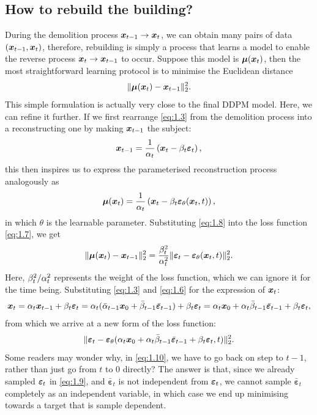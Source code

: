 \subsection{How to rebuild the building?}

During the demolition process $\bm{x}_{t-1}\to\bm{x}_{t}$, we can obtain many pairs of data $(\bm{x}_{t-1},\bm{x}_{t})$, therefore, rebuilding is simply a process that learns a model to enable the reverse process $\bm{x}_{t}\to\bm{x}_{t-1}$ to occur. Suppose this model is $\bm{\mu}(\bm{x}_{t})$, then the most straightforward learning protocol is to minimise the Euclidean distance
\begin{equation}
    \label{eq:1.7}
    \|\bm{\mu}(\bm{x}_{t})-\bm{x}_{t-1}\|_2^2.
\end{equation}
This simple formulation is actually very close to the final DDPM model. Here, we can refine it further. If we first rearrange \cref{eq:1.3} from the demolition process into a reconstructing one by making $\bm{x}_{t-1}$ the subject:
\begin{equation*}
    \bm{x}_{t-1}=\frac{1}{\alpha_t}\left(\bm{x}_{t}-\beta_t\bm{\varepsilon}_t\right),
\end{equation*}
this then inspires us to express the parameterised reconstruction process analogously as
\begin{equation}
    \label{eq:1.8}
    \bm{\mu}(\bm{x}_{t})=\frac{1}{\alpha_t}\left(\bm{x}_{t}-\beta_t\bm{\varepsilon}_\theta(\bm{x}_{t},t)\right),
\end{equation}
in which $\theta$ is the learnable parameter. Substituting \cref{eq:1.8} into the loss function \cref{eq:1.7}, we get
\begin{equation}
    \label{eq:1.9}
    \|\bm{\mu}(\bm{x}_{t})-\bm{x}_{t-1}\|_2^2=\frac{\beta_t^2}{\alpha_t^2}\|\bm{\varepsilon}_t-\bm{\varepsilon}_\theta(\bm{x}_{t},t)\|_2^2.
\end{equation}
Here, $\beta_t^2/\alpha_t^2$ represents the weight of the loss function, which we can ignore it for the time being. Substituting  \cref{eq:1.3} and \cref{eq:1.6} for the expression of $\bm{x}_{t}$:
\begin{equation}
    \label{eq:1.10}    \bm{x}_{t}=\alpha_t\bm{x}_{t-1}+\beta_t\bm{\varepsilon}_t=\alpha_t(\bar{\alpha}_{t-1}\bm{x}_0+\bar{\beta}_{t-1}\bar{\bm{\varepsilon}}_{t-1})+\beta_t\bm{\varepsilon}_t=\alpha_t\bm{x}_0+\alpha_t\bar{\beta}_{t-1}\bar{\bm{\varepsilon}}_{t-1}+\beta_t\bm{\varepsilon}_t,
\end{equation}
from which we arrive at a new form of the loss function:
\begin{equation}
    \label{eq:1.11}
    \|\bm{\varepsilon}_t-\bm{\varepsilon}_\theta(\alpha_t\bm{x}_0+\alpha_t\bar{\beta}_{t-1}\bar{\bm{\varepsilon}}_{t-1}+\beta_t\bm{\varepsilon}_t,t) \|_2^2.
\end{equation}
Some readers may wonder why, in \cref{eq:1.10}, we have to go back on step to $t-1$, rather than just go from $t$ to 0 directly? 
The answer is that, since  we already sampled $\bm{\varepsilon}_t$ in \cref{eq:1.9}, and $\bar{\bm{\varepsilon}}_t$ is not independent from $\bm{\varepsilon}_t$, we cannot sample $\bar{\bm{\varepsilon}}_t$ completely as an independent variable, in which case we end up minimising towards a target that is sample dependent.

